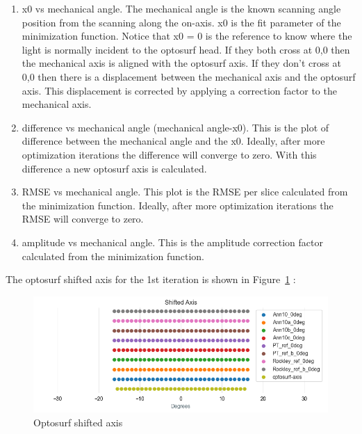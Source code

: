 \documentclass[
  letterpaper,
  DIV=11,
  numbers=noendperiod,
  oneside]{scrreprt}
\begin{document}
\begin{enumerate}
\def\labelenumi{\alph{enumi}.}
\item
  x0 vs mechanical angle. The mechanical angle is the known scanning
  angle position from the scanning along the on-axis. x0 is the fit
  parameter of the minimization function. Notice that x0 = 0 is the
  reference to know where the light is normally incident to the optosurf
  head. If they both cross at 0,0 then the mechanical axis is aligned
  with the optosurf axis. If they don't cross at 0,0 then there is a
  displacement between the mechanical axis and the optosurf axis. This
  displacement is corrected by applying a correction factor to the
  mechanical axis.
\item
  difference vs mechanical angle (mechanical angle-x0). This is the plot
  of difference between the mechanical angle and the x0. Ideally, after
  more optimization iterations the difference will converge to zero.
  With this difference a new optosurf axis is calculated.
\item
  RMSE vs mechanical angle. This plot is the RMSE per slice calculated
  from the minimization function. Ideally, after more optimization
  iterations the RMSE will converge to zero.
\item
  amplitude vs mechanical angle. This is the amplitude correction factor
  calculated from the minimization function.
\end{enumerate}

The optosurf shifted axis for the 1st iteration is shown in
Figure~\ref{fig-4-4} :

\begin{figure}

{\centering \includegraphics{notebooks/c_optimization_files/figure-pdf/fig-4-4-output-1.png}

}

\caption{\label{fig-4-4}Optosurf shifted axis}

\end{figure}
\end{document}
